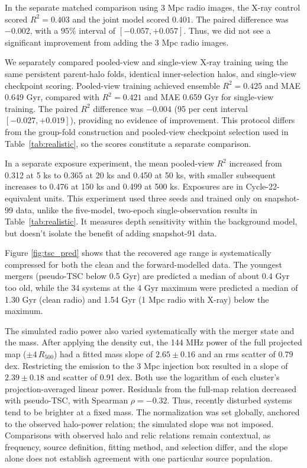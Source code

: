 In the separate matched comparison using 3 Mpc radio images, the X-ray control scored $R^2=0.403$ and the joint model scored $0.401$.
The paired difference was $-0.002$, with a $95\%$ interval of $[-0.057,+0.057]$.
Thus, we did not see a significant improvement from adding the 3 Mpc radio images.

We separately compared pooled-view and single-view X-ray training using the same persistent parent-halo folds, identical inner-selection halos, and single-view checkpoint scoring.
Pooled-view training achieved ensemble $R^2=0.425$ and MAE 0.649 Gyr, compared with $R^2=0.421$ and MAE 0.659 Gyr for single-view training.
The paired $R^2$ difference was $-0.004$ (95 per cent interval $[-0.027,+0.019]$), providing no evidence of improvement.
This protocol differs from the group-fold construction and pooled-view checkpoint selection used in Table~\ref{tab:realistic}, so the scores constitute a separate comparison.

In a separate exposure experiment, the mean pooled-view $R^2$ increased from 0.312 at 5 ks to 0.365 at 20 ks and 0.450 at 50 ks, with smaller subsequent increases to 0.476 at 150 ks and 0.499 at 500 ks.
Exposures are in Cycle-22-equivalent units.
This experiment used three seeds and trained only on snapshot-99 data, unlike the five-model, two-epoch single-observation results in Table~\ref{tab:realistic}.
It measures depth sensitivity within the background model, but doesn't isolate the benefit of adding snapshot-91 data.

Figure \ref{fig:tsc_pred} shows that the recovered age range is systematically compressed for both the clean and the forward-modelled data.
The youngest mergers (pseudo-TSC below 0.5 Gyr) are predicted a median of about 0.4 Gyr too old, while the 34 systems at the 4 Gyr maximum were predicted a median of 1.30 Gyr (clean radio) and 1.54 Gyr (1 Mpc radio with X-ray) below the maximum.

The simulated radio power also varied systematically with the merger state and the mass.
After applying the density cut, the 144 MHz power of the full projected map ($\pm4\,R_{500}$) had a fitted mass slope of $2.65\pm0.16$ and an rms scatter of $0.79$ dex.
Restricting the emission to the 3 Mpc injection box resulted in a slope of $2.39\pm0.18$ and scatter of 0.91 dex.
Both use the logarithm of each cluster's projection-averaged linear power.
Residuals from the full-map relation decreased with pseudo-TSC, with Spearman $\rho=-0.32$.
Thus, recently disturbed systems tend to be brighter at a fixed mass.
The normalization was set globally, anchored to the observed halo-power relation; the simulated slope was not imposed.
Comparisons with observed halo and relic relations remain contextual, as frequency, source definition, fitting method, and selection differ, and the slope alone does not establish agreement with one particular source population.

